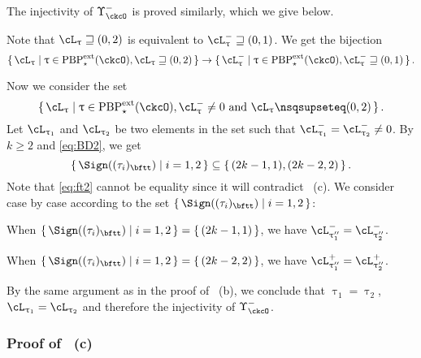 \documentclass[12pt,a4paper]{amsart}
\numberwithin{equation}{section}
\theoremstyle{remark}
\def\PBPes{\mathrm{PBP}^{\mathrm{ext}}_{\star}}
\def\uptaupp{\uptau^{\prime\prime}}
\begin{document}
    \medskip

    The injectivity of $\Upsilon_{\ckcO}^{-}$ is proved similarly, which we give below. 

  Note that $\ac_{\uptau}\sqsupseteq (0,2)$ is equivalent to
  $\nac{\uptau}\sqsupseteq (0,1)$.
  We get the bijection
  \[
    \set{\ac_{\uptau}|\uptau\in \PBPes(\ckcO),\ac_{\uptau}\sqsupseteq (0,2)} \rightarrow
    \set{\nac{\uptau}|\uptau\in \PBPes(\ckcO),\nac{\uptau}\sqsupseteq (0,1)}.
  \]

  Now we consider the set
 \[
  \set{\ac_{\uptau}|\uptau\in \PBPes(\ckcO),\nac{\uptau}\neq 0 \text{ and } \ac_{\uptau}\nsqsupseteq (0,2)}.
 \]
  Let $\ac_{\uptau_{1}}$ and $\ac_{\uptau_{2}}$ be two elements in the set such that
  $\nac{\uptau_{1}}=\nac{\uptau_{2}}\neq 0$.
  By $k\geq 2$ and \eqref{eq:BD2}, we get
  \begin{equation}\label{eq:ft2}
  \set{\Sign((\tau_{i})_{\bftt})| i = 1,2} \subseteq \set{ (2k-1,1),(2k-2,2)}.
  \end{equation}
  Note that \eqref{eq:ft2} cannot be equality since it will contradict ~(c).
  We consider case by case according to the set $\set{\Sign((\tau_{i})_{\bftt})|i=1,2}$:
  \begin{enumPF}
    \item When
    $\set{\Sign((\tau_{i})_{\bftt})|i=1,2} = \set{(2k-1,1)}$,
    we have $\nac{\uptau''_{1}} = \nac{\uptau''_{2}}$.
    \item When
    $\set{\Sign((\tau_{i})_{\bftt})|i=1,2} = \set{(2k-2,2)}$,
     we have
    $\pac{\uptau''_{1}} = \pac{\uptau''_{2}}$. 
  \end{enumPF}
  By the same argument as in the proof of ~(b), 
  we conclude that $\uptau_1 = \uptau_2$, $\ac_{ \uptau_{1} }=\ac_{ \uptau_{2} }$ and
  therefore the injectivity of $\Upsilon_{\ckcO}^{-}$.

  \subsubsection*{Proof of ~(c)}
\end{document}
